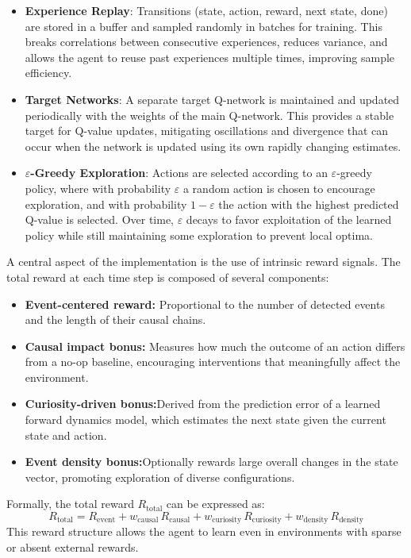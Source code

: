 \documentclass[12pt,a4paper]{report}
\begin{document}
\begin{itemize}
    \item \textbf{Experience Replay}: Transitions (state, action, reward, next state, done) are stored in a buffer and sampled randomly in batches for training. This breaks correlations between consecutive experiences, reduces variance, and allows the agent to reuse past experiences multiple times, improving sample efficiency.
    \item \textbf{Target Networks}: A separate target Q-network is maintained and updated periodically with the weights of the main Q-network. This provides a stable target for Q-value updates, mitigating oscillations and divergence that can occur when the network is updated using its own rapidly changing estimates.
    \item \textbf{$\varepsilon$-Greedy Exploration}: Actions are selected according to an $\varepsilon$-greedy policy, where with probability $\varepsilon$ a random action is chosen to encourage exploration, and with probability $1-\varepsilon$ the action with the highest predicted Q-value is selected. Over time, $\varepsilon$ decays to favor exploitation of the learned policy while still maintaining some exploration to prevent local optima.
\end{itemize}
A central aspect of the implementation is the use of intrinsic reward signals. The total reward at each time step is composed of several components:
\begin{itemize}
    \item \textbf{Event-centered reward:} Proportional to the number of detected events and the length of their causal chains.
    \item \textbf{Causal impact bonus:} Measures how much the outcome of an action differs from a no-op baseline, encouraging interventions that meaningfully affect the environment.
    \item \textbf{Curiosity-driven bonus:}Derived from the prediction error of a learned forward dynamics model, which estimates the next state given the current state and action.
    \item \textbf{Event density bonus:}Optionally rewards large overall changes in the state vector, promoting exploration of diverse configurations.
\end{itemize}
Formally, the total reward $R_{\text{total}}$ can be expressed as:
\begin{equation}
R_{\text{total}} = R_{\text{event}} + w_{\text{causal}} \, R_{\text{causal}} + 
w_{\text{curiosity}} \, R_{\text{curiosity}} + w_{\text{density}} \, R_{\text{density}}
\end{equation}
This reward structure allows the agent to learn even in environments with sparse or absent external rewards.
\end{document}
